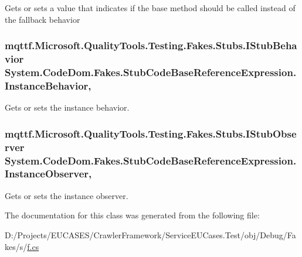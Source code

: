 Gets or sets a value that indicates if the base method should be called instead of the fallback behavior

\hypertarget{class_system_1_1_code_dom_1_1_fakes_1_1_stub_code_base_reference_expression_aff0df559de52ec45d73c871dfd533f70}{
\subsubsection[{Instance\-Behavior}]{\setlength{\rightskip}{0pt plus 5cm}mqttf.\-Microsoft.\-Quality\-Tools.\-Testing.\-Fakes.\-Stubs.\-I\-Stub\-Behavior System.\-Code\-Dom.\-Fakes.\-Stub\-Code\-Base\-Reference\-Expression.\-Instance\-Behavior\hspace{0.3cm}{\ttfamily [get]}, {\ttfamily [set]}}}\label{class_system_1_1_code_dom_1_1_fakes_1_1_stub_code_base_reference_expression_aff0df559de52ec45d73c871dfd533f70}


Gets or sets the instance behavior.

\hypertarget{class_system_1_1_code_dom_1_1_fakes_1_1_stub_code_base_reference_expression_a7b598feedf3abeda00bffbc8754efece}{
\subsubsection[{Instance\-Observer}]{\setlength{\rightskip}{0pt plus 5cm}mqttf.\-Microsoft.\-Quality\-Tools.\-Testing.\-Fakes.\-Stubs.\-I\-Stub\-Observer System.\-Code\-Dom.\-Fakes.\-Stub\-Code\-Base\-Reference\-Expression.\-Instance\-Observer\hspace{0.3cm}{\ttfamily [get]}, {\ttfamily [set]}}}\label{class_system_1_1_code_dom_1_1_fakes_1_1_stub_code_base_reference_expression_a7b598feedf3abeda00bffbc8754efece}


Gets or sets the instance observer.



The documentation for this class was generated from the following file\-:\begin{DoxyCompactItemize}
\item 
D\-:/\-Projects/\-E\-U\-C\-A\-S\-E\-S/\-Crawler\-Framework/\-Service\-E\-U\-Cases.\-Test/obj/\-Debug/\-Fakes/s/\hyperlink{s_2f_8cs}{f.\-cs}\end{DoxyCompactItemize}
